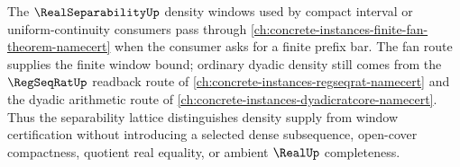The $\RealSeparabilityUp$ density windows used by compact interval or uniform-continuity consumers pass through \autoref{ch:concrete-instances-finite-fan-theorem-namecert} when the consumer asks for a finite prefix bar. The fan route supplies the finite window bound; ordinary dyadic density still comes from the $\RegSeqRatUp$ readback route of \autoref{ch:concrete-instances-regseqrat-namecert} and the dyadic arithmetic route of \autoref{ch:concrete-instances-dyadicratcore-namecert}. Thus the separability lattice distinguishes density supply from window certification without introducing a selected dense subsequence, open-cover compactness, quotient real equality, or ambient $\RealUp$ completeness.
